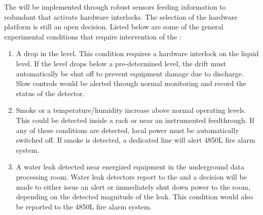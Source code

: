 The  will be implemented through robust sensors feeding
information to redundant  that activate hardware
interlocks. The selection of the  hardware platform is
still an open decision.  Listed below are some of the general
 experimental conditions that require intervention of the
:
\begin{enumerate}
 \item A drop in the  level.  This condition requires a hardware
   interlock on the liquid level.  If the level drops below a
   pre-determined level, the drift   must automatically be 
   shut off to prevent equipment damage due to  discharge.  Slow controls would be
   alerted through normal monitoring and record the status of the detector.
 \item Smoke or a temperature/humidity increase above normal operating
   levels. This could be detected inside a rack or near an instrumented
   feedthrough.  If any of these conditions are detected, local
   power must be automatically switched off. If smoke is detected, a
   dedicated line will alert 4850L fire alarm system.
 \item A water leak detected near energized equipment in the 
   underground data processing room.  Water leak detectors 
   report to the   and a decision will be made to either
   issue an alert or immediately shut down power to the room, depending
   on the detected magnitude of the leak.  This condition would also be reported
   to the 4850L fire alarm system.
\end{enumerate}




